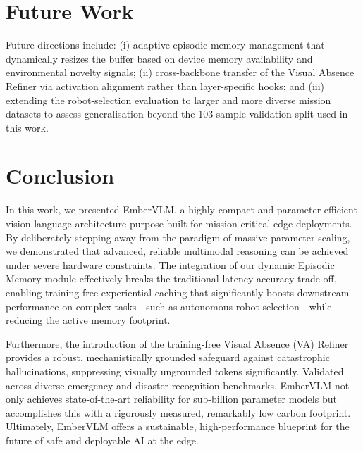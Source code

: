 \documentclass[runningheads]{llncs}
\begin{document}
\section{Future Work}

Future directions include: (i) adaptive episodic memory management
that dynamically resizes the buffer based on device memory
availability and environmental novelty signals; (ii) cross-backbone
transfer of the Visual Absence Refiner via activation alignment
rather than layer-specific hooks; and (iii) extending the
robot-selection evaluation to larger and more diverse mission
datasets to assess generalisation beyond the 103-sample validation
split used in this work.

\section{Conclusion}
\label{sec:conclusion}

In this work, we presented EmberVLM, a highly compact and parameter-efficient vision-language architecture purpose-built for mission-critical edge deployments. By deliberately stepping away from the paradigm of massive parameter scaling, we demonstrated that advanced, reliable multimodal reasoning can be achieved under severe hardware constraints. The integration of our dynamic Episodic Memory module effectively breaks the traditional latency-accuracy trade-off, enabling training-free experiential caching that significantly boosts downstream performance on complex tasks—such as autonomous robot selection—while reducing the active memory footprint. 

Furthermore, the introduction of the training-free Visual Absence (VA) Refiner provides a robust, mechanistically grounded safeguard against catastrophic hallucinations, suppressing visually ungrounded tokens significantly. Validated across diverse emergency and disaster recognition benchmarks, EmberVLM not only achieves state-of-the-art reliability for sub-billion parameter models but accomplishes this with a rigorously measured, remarkably low carbon footprint. Ultimately, EmberVLM offers a sustainable, high-performance blueprint for the future of safe and deployable AI at the edge.

%
%
%
%


\end{document}
